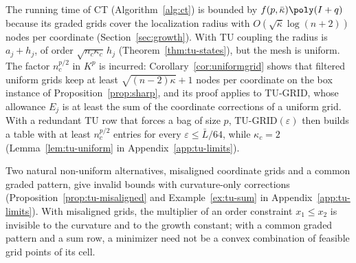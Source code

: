 The running time of CT (Algorithm~\ref{alg:ct}) is bounded by
$f(p,\bar\kappa)\poly(I+q)$ because its graded grids cover the localization
radius with $O(\sqrt{\bar\kappa}\log(n+2))$ nodes per coordinate
(Section~\ref{sec:growth}). With TU coupling the radius is
$a_j+h_j$, of order $\sqrt{n_c\kappa_c}\,h_j$ (Theorem~\ref{thm:tu-states}),
but the mesh is uniform. The factor $n_c^{p/2}$ in $K^p$ is incurred:
Corollary~\ref{cor:uniformgrid} shows that filtered uniform grids keep at
least $\sqrt{(n-2)\kappa}+1$ nodes per coordinate on the box instance of
Proposition~\ref{prop:sharp}, and its proof applies to TU-GRID, whose
allowance $E_j$ is at least the sum of the coordinate corrections of a
uniform grid. With a redundant TU row that forces a bag of size $p$,
TU-GRID$(\varepsilon)$ then builds a table with at least $n_c^{p/2}$ entries
for every $\varepsilon\le\bar L/64$, while $\kappa_c=2$
(Lemma~\ref{lem:tu-uniform} in Appendix~\ref{app:tu-limits}).

Two natural non-uniform alternatives, misaligned coordinate grids and a
common graded pattern, give invalid bounds with curvature-only corrections
(Proposition~\ref{prop:tu-misaligned} and Example~\ref{ex:tu-sum} in
Appendix~\ref{app:tu-limits}). With misaligned grids, the multiplier of an
order constraint $x_1\le x_2$ is invisible to the curvature and to the growth
constant; with a common graded pattern and a sum row, a minimizer need not be
a convex combination of feasible grid points of its cell.

